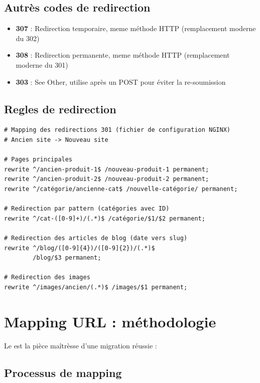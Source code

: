 \subsection{Autrès codes de redirection}

\begin{itemize}
    \item \textbf{307} : Redirection temporaire, meme méthode HTTP (remplacement moderne du 302)
    \item \textbf{308} : Redirection permanente, meme méthode HTTP (remplacement moderne du 301)
    \item \textbf{303} : See Other, utilise après un POST pour éviter la re-soumission
\end{itemize}

\subsection{Regles de redirection}

\begin{lstlisting}[style=code,caption={Fichier de redirection NGINX pour migration massive}]
# Mapping des redirections 301 (fichier de configuration NGINX)
# Ancien site -> Nouveau site

# Pages principales
rewrite ^/ancien-produit-1$ /nouveau-produit-1 permanent;
rewrite ^/ancien-produit-2$ /nouveau-produit-2 permanent;
rewrite ^/catégorie/ancienne-cat$ /nouvelle-catégorie/ permanent;

# Redirection par pattern (catégories avec ID)
rewrite ^/cat-([0-9]+)/(.*)$ /catégorie/$1/$2 permanent;

# Redirection des articles de blog (date vers slug)
rewrite ^/blog/([0-9]{4})/([0-9]{2})/(.*)$
        /blog/$3 permanent;

# Redirection des images
rewrite ^/images/ancien/(.*)$ /images/$1 permanent;
\end{lstlisting}

\section{Mapping URL : méthodologie}

Le  est la pièce maîtrèsse d'une migration réussie :

\subsection{Processus de mapping}

